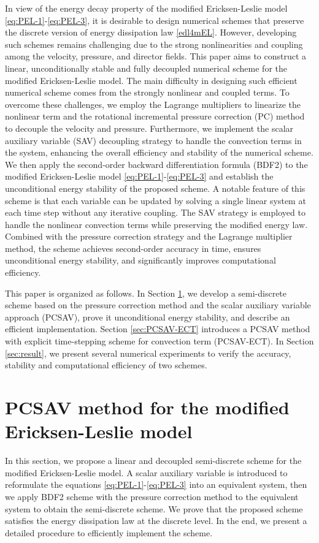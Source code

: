 \documentclass[12pt,reqno]{amsart}
\numberwithin{equation}{section}
\begin{document}
In view of the energy decay property of the modified Ericksen-Leslie model \eqref{eq:PEL-1}-\eqref{eq:PEL-3}, it is desirable to design numerical schemes that preserve the discrete version of energy dissipation law \eqref{edl4mEL}.
However, developing such schemes remains challenging due to the strong nonlinearities and coupling among the velocity, pressure, and director fields.
This paper aims to construct a linear, unconditionally stable and fully decoupled numerical scheme for the modified Ericksen-Leslie model.
The main difficulty in designing such efficient numerical scheme comes from the strongly nonlinear and coupled terms.  
To overcome these challenges, we employ the Lagrange multipliers \cite{25Guillen} to linearize the nonlinear term and the rotational incremental pressure correction (PC) method \cite{11Guermond} to decouple the velocity and pressure.
Furthermore, we implement the scalar auxiliary variable (SAV) \cite{16Jiang} decoupling strategy to handle the convection terms in the system, enhancing the overall efficiency and stability of the numerical scheme.
We then apply the second-order backward differentiation formula (BDF2) to the modified Ericksen-Leslie model \eqref{eq:PEL-1}-\eqref{eq:PEL-3} and establish the unconditional energy stability of the proposed scheme.  
A notable feature of this scheme is that each variable can be updated by solving a single linear system at each time step without any iterative coupling. The SAV strategy is employed to handle the nonlinear convection terms while preserving the modified energy law. Combined with the pressure correction strategy and the Lagrange multiplier method, the scheme achieves second-order accuracy in time, ensures unconditional energy stability, and significantly improves computational efficiency.






This paper is organized as follows. In Section \ref{sec:pcsav}, we develop a semi-discrete scheme based on the pressure correction method and the scalar auxiliary variable approach (PCSAV), prove it unconditional energy stability, and describe an efficient implementation. Section \ref{sec:PCSAV-ECT} introduces a PCSAV method with explicit time-stepping scheme for convection term (PCSAV-ECT). In Section \ref{sec:result}, we present several numerical experiments to verify the accuracy, stability and computational efficiency of two schemes.

\section{PCSAV method for the modified Ericksen-Leslie model}\label{sec:pcsav}
In this section, we propose a linear and decoupled semi-discrete scheme for the modified Ericksen-Leslie model. 
A scalar auxiliary variable is introduced to reformulate the equations \eqref{eq:PEL-1}-\eqref{eq:PEL-3} into an equivalent system, then we apply BDF2 scheme with the pressure correction method to the equivalent system to obtain the semi-discrete scheme.
We prove that the proposed scheme satisfies the energy dissipation law at the discrete level.
In the end, we present a detailed procedure to efficiently implement the scheme. 
\end{document}
